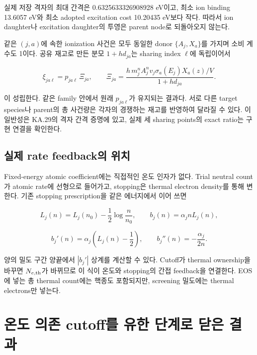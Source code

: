 실제 저장 격자의 최대 간격은 0.6325633326908928 eV이고, 최소 ion binding 13.6057 eV와 최소 adopted excitation cost 10.20435 eV보다 작다. 따라서 ion daughter나 excitation daughter의 투영은 parent node로 되돌아오지 않는다.

같은 \((j,a)\)에 속한 ionization 사건은 모두 동일한 donor \(\{A_j,X_a\}\)를 가지며 소비 계수도 1이다. 공유 재고로 만든 분모 \(1+h d_{ja}\)는 sharing index \(\ell\)에 독립이어서

\[
\boxed{\xi_{ja\ell}=p_{ja\ell}\,\Xi_{ja},\qquad
\Xi_{ja}=\frac{h\,m_j^nA_j^nv_j\sigma_a(E_j)X_a(z)/V}{1+h d_{ja}}.}
\]

이 성립한다. 같은 family 안에서 원래 \(p_{ja\ell}\)가 유지되는 결과다. 서로 다른 target species나 parent의 총 사건량은 각자의 경쟁하는 재고를 반영하여 달라질 수 있다. 이 일반성은 KA.29의 격자 간격 증명에 있고, 실제 세 sharing points의 exact ratio는 구현 연결을 확인한다.

\hypertarget{uxc2e4uxc81c-rate-feedbackuxc758-uxc704uxce58}{%
\subsection{실제 rate feedback의 위치}\label{uxc2e4uxc81c-rate-feedbackuxc758-uxc704uxce58}}

Fixed-energy atomic coefficient에는 직접적인 온도 인자가 없다. Trial neutral count가 atomic rate에 선형으로 들어가고, stopping은 thermal electron density를 통해 변한다. 기존 stopping prescription을 같은 에너지에서 이어 쓰면

\[
L_j(n)=L_j(n_0)-\frac12\log\frac n{n_0},\qquad b_j(n)=\alpha_jnL_j(n),
\]

\[
b_j'(n)=\alpha_j\left(L_j(n)-\frac12\right),\qquad
b_j''(n)=-\frac{\alpha_j}{2n}.
\]

양의 밀도 구간 양끝에서 \(|b_j'|\) 상계를 계산할 수 있다. Cutoff가 thermal ownership을 바꾸면 \(N_{e,\rm th}\)가 바뀌므로 이 식이 온도와 stopping의 간접 feedback을 연결한다. EOS에 넣는 총 thermal count에는 핵종도 포함되지만, screening 밀도에는 thermal electrons만 넣는다.

\hypertarget{uxc628uxb3c4-uxc758uxc874-cutoffuxb97c-uxc720uxd55c-uxb2e8uxacc4uxb85c-uxb2ebuxc740-uxacb0uxacfc}{%
\section{온도 의존 cutoff를 유한 단계로 닫은 결과}\label{uxc628uxb3c4-uxc758uxc874-cutoffuxb97c-uxc720uxd55c-uxb2e8uxacc4uxb85c-uxb2ebuxc740-uxacb0uxacfc}}

